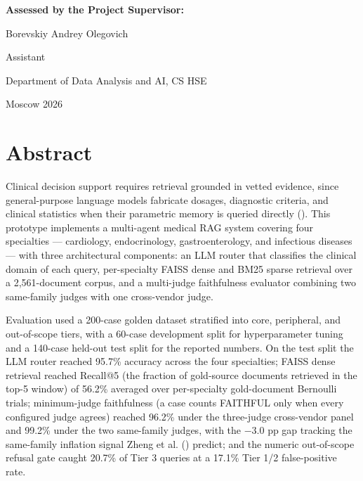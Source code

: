 \documentclass[
  american,
  a4paper,
]{article}
\begin{document}
\begin{titlepage}
\begin{flushleft}
\vspace{0.7cm}

\hspace{1cm}\textbf{Assessed by the Project Supervisor:}\par
\vspace{0.3cm}
\hspace{1cm}\begin{minipage}{0.92\textwidth}
Borevskiy Andrey Olegovich\par
Assistant\par
Department of Data Analysis and AI, CS HSE\par
\end{minipage}
\end{flushleft}

\vfill

{\large Moscow 2026\par}

\vspace{0.5cm}

\end{titlepage}

\renewcommand*\contentsname{Contents}
{
\setcounter{tocdepth}{2}
\tableofcontents
}
\section{Abstract}\label{abstract}

Clinical decision support requires retrieval grounded in vetted
evidence, since general-purpose language models fabricate dosages,
diagnostic criteria, and clinical statistics when their parametric
memory is queried directly (). This prototype implements a multi-agent medical RAG system
covering four specialties --- cardiology, endocrinology,
gastroenterology, and infectious diseases --- with three architectural
components: an LLM router that classifies the clinical domain of each
query, per-specialty FAISS dense and BM25 sparse retrieval over a
2,561-document corpus, and a multi-judge faithfulness evaluator
combining two same-family judges with one cross-vendor judge.

Evaluation used a 200-case golden dataset stratified into core,
peripheral, and out-of-scope tiers, with a 60-case development split for
hyperparameter tuning and a 140-case held-out test split for the
reported numbers. On the test split the LLM router reached 95.7\%
accuracy across the four specialties; FAISS dense retrieval reached
Recall@5 (the fraction of gold-source documents retrieved in the top-5
window) of 56.2\% averaged over per-specialty gold-document Bernoulli
trials; minimum-judge faithfulness (a case counts FAITHFUL only when
every configured judge agrees) reached 96.2\% under the three-judge
cross-vendor panel and 99.2\% under the two same-family judges, with the
−3.0 pp gap tracking the same-family inflation signal Zheng et al.
() predict; and the numeric
out-of-scope refusal gate caught 20.7\% of Tier 3 queries at a 17.1\%
Tier 1/2 false-positive rate.
\end{document}
